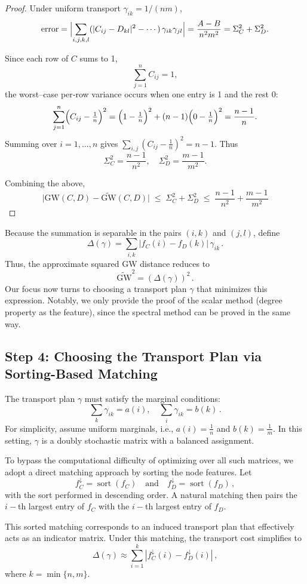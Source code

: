\documentclass{article}
\begin{document}
\begin{proof}
Under uniform transport
\(\gamma_{ik}=1/(nm)\),
\[
\mathrm{error} 
=\Bigl|\sum_{i,j,k,l}(|C_{ij}-D_{kl}|^2 -\cdots)\,\gamma_{ik}\gamma_{jl}\Bigr|
=\frac{A-B}{n^2m^2}
=\Sigma_C^2+\Sigma_D^2.
\]

Since each row of \(C\) sums to 1,
\[
\sum_{j=1}^n C_{ij}=1,
\]
the worst–case per‐row variance occurs when one entry is 1 and the rest 0:
\[
\sum_{j=1}^n\Bigl(C_{ij}-\tfrac1n\Bigr)^2
=\Bigl(1-\tfrac1n\Bigr)^2 + (n-1)\Bigl(0-\tfrac1n\Bigr)^2
=\frac{n-1}{n}.
\]
Summing over \(i=1,\dots,n\) gives
\(\sum_{i,j}(C_{ij}-\tfrac1n)^2 = n-1\).  Thus
\[
\Sigma_C^2 = \frac{n-1}{n^2},
\quad
\Sigma_D^2 = \frac{m-1}{m^2}.
\]

Combining the above,
\[
\bigl|\mathrm{GW}(C,D) - \widetilde{\mathrm{GW}}(C,D)\bigr|
\;\le\;
\Sigma_C^2 + \Sigma_D^2
\;\le\;
\frac{n-1}{n^2} + \frac{m-1}{m^2}
\]
\end{proof}

Because the summation is separable in the pairs \((i,k)\) and \((j,l)\), define
\[
\Delta(\gamma) = \sum_{i,k} \big| f_C(i) - f_D(k) \big| \, \gamma_{ik}\,.
\]
Thus, the approximate squared GW distance reduces to
\[
\widetilde{\text{GW}}^2 = \left( \Delta(\gamma) \right)^2\,.
\]
Our focus now turns to choosing a transport plan \( \gamma \) that minimizes this expression. Notably, we only provide the proof of the scalar method (degree property as the feature), since the spectral method can be proved in the same way.

\subsection*{Step 4: Choosing the Transport Plan via Sorting-Based Matching}
The transport plan \( \gamma \) must satisfy the marginal conditions:
\[
\sum_{k} \gamma_{ik} = a(i), \quad \sum_{i} \gamma_{ik} = b(k)\,.
\]
For simplicity, assume uniform marginals, i.e., \( a(i) = \frac{1}{n} \) and \( b(k) = \frac{1}{m} \). In this setting, \( \gamma \) is a doubly stochastic matrix with a balanced assignment.

To bypass the computational difficulty of optimizing over all such matrices, we adopt a direct matching approach by sorting the node features. Let
\[
f_C^{\downarrow} = \operatorname{sort}(f_C) \quad \text{and} \quad f_D^{\downarrow} = \operatorname{sort}(f_D)\,,
\]
with the sort performed in descending order. A natural matching then pairs the \( i- \)th largest entry of \( f_C \) with the \( i- \)th largest entry of \( f_D \).

This sorted matching corresponds to an induced transport plan that effectively acts as an indicator matrix. Under this matching, the transport cost simplifies to
\[
\Delta(\gamma) \approx \sum_{i=1}^{k} \left| f_C^{\downarrow}(i) - f_D^{\downarrow}(i) \right|\,,
\]
where \( k = \min\{n, m\} \).
\end{document}
